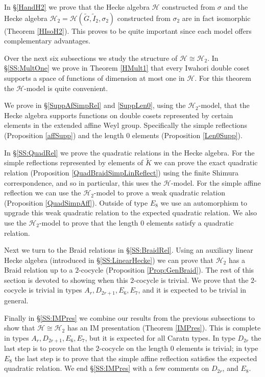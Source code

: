 \documentclass[10pt, letterpaper]{amsart}
\theoremstyle{plain}
\theoremstyle{definition}
\numberwithin{equation}{section}
\newcommand{\Gt}{\widetilde{G}}
\newcommand{\It}{\widetilde{I}}
\newcommand{\Kt}{\widetilde{K}}
\newcommand{\Hcal}{\mathcal{H}}
\begin{document}
In \S \ref{HandH2} we prove that the Hecke algebra $\Hcal$ constructed from $\sigma$ and the Hecke algebra $\Hcal_{2}=\Hcal(\Gt,\It_{2},\sigma_{2})$ constructed from $\sigma_{2}$ are in fact isomorphic (Theorem \ref{HIsoH2}). This proves to be quite important since each model offers complementary advantages. 

Over the next six subsections we study the structure of $\Hcal\cong \Hcal_{2}$. In \S \ref{SS:MultOne} we prove in Theorem \ref{HMult1} that every Iwahori double coset supports a space of functions of dimension at most one in $\Hcal$. For this theorem the $\Hcal$-model is quite convenient.

We prove in \S \ref{SuppAfSimpRel} and \ref{SuppLen0}, using the $\Hcal_{2}$-model, that the Hecke algebra supports functions on double cosets represented by certain elements in the extended affine Weyl group. Specifically the simple reflections (Proposition \ref{affSupp}) and the length $0$ elements (Proposition \ref{Len0Supp}).

In \S \ref{SS:QuadRel} we prove the quadratic relations in the Hecke algebra. For the simple reflections represented by elements of $\Kt$ we can prove the exact quadratic relation (Proposition \ref{QuadBraidSimpLinReflect}) using the finite Shimura correspondence, and so in particular, this uses the $\Hcal$-model. For the simple affine reflection we can use the $\Hcal_{2}$-model to prove a weak quadratic relation (Proposition \ref{QuadSimpAff}). Outside of type $E_{8}$ we use an automorphism to upgrade this weak quadratic relation to the expected quadratic relation. We also use the $\Hcal_{2}$-model to prove that the length $0$ elements satisfy a quadratic relation.

Next we turn to the Braid relations in \S \ref{SS:BraidRel}. Using an auxiliary linear Hecke algebra (introduced in \S \ref{SS:LinearHecke}) we can prove that $\Hcal_{2}$ has a Braid relation up to a $2$-cocycle (Proposition \ref{Prop:GenBraid}). The rest of this section is devoted to showing when this $2$-cocycle is trivial. We prove that the $2$-cocycle is trivial in types $A_{r},D_{2r+1},E_{6},E_{7}$, and it is expected to be trivial in general. 


Finally in \S \ref{SS:IMPres} we combine our results from the previous subsections to show that $\Hcal\cong\Hcal_{2}$ has an IM presentation (Theorem \ref{IMPres}). This is complete in types $A_{r},D_{2r+1},E_{6},E_{7}$, but it is expected for all Caratn types. In type $D_{2r}$ the last step is to prove that the $2$-cocycle on the length $0$ elements is trivial; in type $E_{8}$ the last step is to prove that the simple affine reflection satisfies the expected quadratic relation. We end \S \ref{SS:IMPres} with a few comments on $D_{2r}$, and $E_{8}$.
\end{document}
